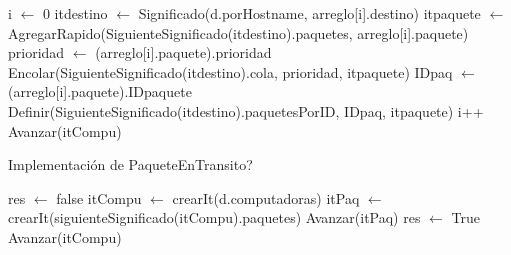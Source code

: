 \begin{Algoritmos}
\begin{algorithm}
\begin{algorithmic}[0]
	
\end{algorithmic}
\end{algorithm}

\begin{algorithm}
\begin{algorithmic}[0]

	
	\State {}
	\State i $\gets$ 0
	 	
			\State itdestino $\gets$ Significado(d.porHostname, arreglo[i].destino) 
			\State itpaquete $\gets$ AgregarRapido(SiguienteSignificado(itdestino).paquetes, arreglo[i].paquete) 
			\State {}
			\State prioridad $\gets$ (arreglo[i].paquete).prioridad
			\State Encolar(SiguienteSignificado(itdestino).cola, prioridad, itpaquete) 
			\State IDpaq $\gets$ (arreglo[i].paquete).IDpaquete 		
			\State Definir(SiguienteSignificado(itdestino).paquetesPorID, IDpaq, itpaquete) 
		\EndIf
	\State i++
	\State Avanzar(itCompu)
	\EndWhile
	
\EndFunction {}
\end{algorithmic}
\end{algorithm}

\begin{algorithm}
\caption{Implementaci\'on de PaqueteEnTransito?}
\begin{algorithmic}[0]
	\State res $\gets$ false 
	\State itCompu $\gets$ crearIt(d.computadoras) 
		\newline  {}
		\State itPaq $\gets$ crearIt(siguienteSignificado(itCompu).paquetes) 
			\State Avanzar(itPaq)  
		\EndWhile
		 
			\State res $\gets$ True 
		\EndIf
		\State Avanzar(itCompu) 
	\EndWhile
\EndFunction {}
\end{algorithmic}
\end{algorithm}


\end{Algoritmos}
